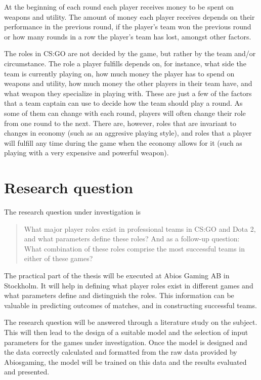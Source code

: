 \documentclass{article}
\begin{document}
At the beginning of each round each player receives money to be spent on weapons and utility. The amount of money each player receives depends on their performance in the previous round, if the player's team won the previous round or how many rounds in a row the player's team has lost, amongst other factors.

The roles in CS:GO are not decided by the game, but rather by the team and/or circumstance. The role a player fulfills depends on, for instance, what side the team is currently playing on, how much money the player has to spend on weapons and utility, how much money the other players in their team have, and what weapon they specialize in playing with. These are just a few of the factors that a team captain can use to decide how the team should play a round. As some of them can change with each round, players will often change their role from one round to the next. There are, however, roles that are invariant to changes in economy (such as an aggresive playing style), and roles that a player will fulfill any time during the game when the economy allows for it (such as playing with a very expensive and powerful weapon).

\section{Research question}
The research question under investigation is
\begin{quote}
    What major player roles exist in professional teams in CS:GO and Dota 2, and what parameters define these roles? And as a follow-up question: What combination of these roles comprise the most successful teams in either of these games?
\end{quote}

The practical part of the thesis will be executed at Abios Gaming AB in Stockholm. It will help in defining what player roles exist in different games and what parameters define and distinguish the roles. This information can be valuable in predicting outcomes of matches, and in constructing successful teams.

The research question will be answered through a literature study on the subject. This will then lead to the design of a suitable model and the selection of input parameters for the games under investigation. Once the model is designed and the data correctly calculated and formatted from the raw data provided by Abiosgaming, the model will be trained on this data and the results evaluated and presented.
\end{document}

